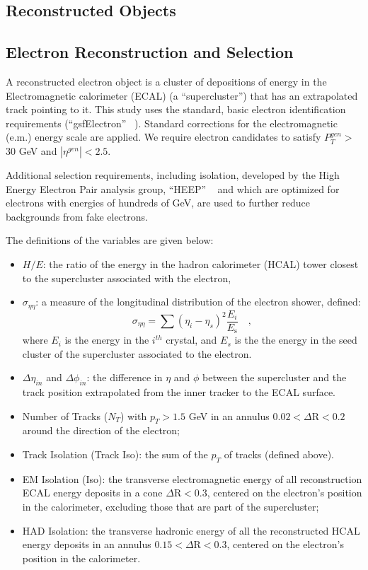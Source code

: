 \documentclass{cmspaper}
\begin{document}
\begin{linenumbers}
\section{Reconstructed Objects} 

\subsection{Electron Reconstruction and Selection} \label{sec:electrons}
A reconstructed electron object is a cluster of depositions 
of energy in the Electromagnetic calorimeter (ECAL) (a ``supercluster'') that has an 
extrapolated track pointing to it. This study uses the standard, basic electron
identification requirements (``gsfElectron'' ~\cite{GSFele}).
Standard corrections  for
the electromagnetic (e.m.) energy scale are applied.
We require electron candidates to satisfy $P_{T}^{gen}>$ 30 GeV 
and $|\eta^{gen}|<2.5$. 

Additional selection requirements, including isolation,
developed by the High Energy Electron Pair
 analysis group, ``HEEP'' ~\cite{HEEPNOTE} and which are optimized for 
electrons with energies of hundreds of GeV,
are used to further reduce backgrounds
from fake electrons.

The definitions of the variables are given below:
%
\begin{itemize}
%
\item $H/E$: the ratio of the energy in the hadron calorimeter (HCAL)
tower closest 
 to the supercluster associated with the electron,
%
\item $\sigma_{\eta\eta}$: a measure of 
the longitudinal distribution of the electron shower, defined:
\begin{displaymath}
\sigma_{\eta\eta} = \sum( \eta_i - \eta_s )^2 \frac{E_i}{E_{\mbox{s}}} \quad ,
\end{displaymath}
where $E_i$ is the energy in the $i^{th}$ crystal, and $E_s$ is the the energy in the seed cluster of the supercluster associated to the electron.
%
\item $\Delta\eta_{in}$ and $\Delta\phi_{in}$: the difference in $\eta$ and $\phi$ between the supercluster and the track position extrapolated from 
the inner tracker to the ECAL surface.
%
\item Number of Tracks ($N_T$) with $p_{T}>1.5$ GeV in an annulus $0.02 < \Delta\mbox{R} < 0.2 $ around the direction of the electron;
%
\item Track Isolation (Track Iso): the sum of the $p_{T}$ of tracks (defined above).
%
%
\item EM Isolation (Iso): the transverse electromagnetic energy 
of all reconstruction ECAL energy deposits
in a cone $\Delta\mbox{R} < 0.3$, 
centered on the electron's position in the calorimeter, excluding those
that are part of the supercluster;
%
\item HAD Isolation: the transverse  hadronic energy of all the 
reconstructed HCAL energy deposits in an annulus
$0.15 < \Delta\mbox{R} < 0.3$, centered on the electron's position in the calorimeter. 
%
\end{itemize}


\end{linenumbers}
\end{document}
